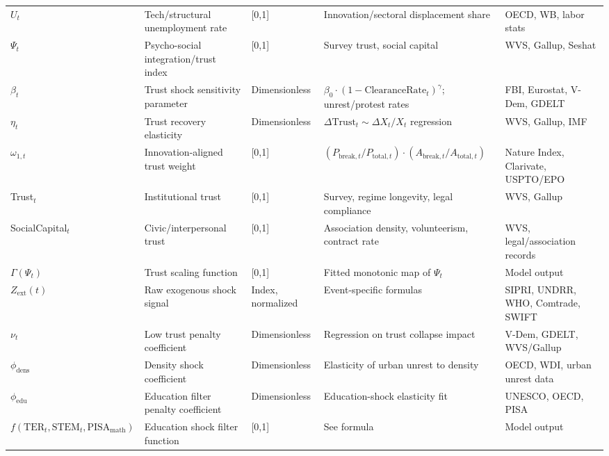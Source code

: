 \documentclass[12pt]{article}
\begin{document}
\begin{longtable}{|p{2.8cm}|p{4.3cm}|p{2.0cm}|p{3.0cm}|p{3.0cm}|}
$U_t$ & Tech/structural unemployment rate & [0,1] & Innovation/sectoral displacement share & OECD, WB, labor stats \\
$\Psi_t$ & Psycho-social integration/trust index & [0,1] & Survey trust, social capital & WVS, Gallup, Seshat \\
$\beta_t$ & Trust shock sensitivity parameter & Dimensionless & $\beta_0 \cdot (1 - \text{ClearanceRate}_t)^\gamma$; unrest/protest rates & FBI, Eurostat, V-Dem, GDELT \\
$\eta_t$ & Trust recovery elasticity & Dimensionless & $\Delta \text{Trust}_t \sim \Delta X_t / X_t$ regression & WVS, Gallup, IMF \\
$\omega_{1,t}$ & Innovation-aligned trust weight & [0,1] & $(P_{\text{break},t} / P_{\text{total},t}) \cdot (A_{\text{break},t} / A_{\text{total},t})$ & Nature Index, Clarivate, USPTO/EPO \\
Trust$_t$ & Institutional trust & [0,1] & Survey, regime longevity, legal compliance & WVS, Gallup \\
SocialCapital$_t$ & Civic/interpersonal trust & [0,1] & Association density, volunteerism, contract rate & WVS, legal/association records \\
$\Gamma(\Psi_t)$ & Trust scaling function & [0,1] & Fitted monotonic map of $\Psi_t$ & Model output \\
$Z_{\text{ext}}(t)$ & Raw exogenous shock signal & Index, normalized & Event-specific formulas & SIPRI, UNDRR, WHO, Comtrade, SWIFT \\
$\nu_t$ & Low trust penalty coefficient & Dimensionless & Regression on trust collapse impact & V-Dem, GDELT, WVS/Gallup \\
$\phi_{\text{dens}}$ & Density shock coefficient & Dimensionless & Elasticity of urban unrest to density & OECD, WDI, urban unrest data \\
$\phi_{\text{edu}}$ & Education filter penalty coefficient & Dimensionless & Education-shock elasticity fit & UNESCO, OECD, PISA \\
$f(\text{TER}_t, \text{STEM}_t, \text{PISA}_\text{math})$ & Education shock filter function & [0,1] & See formula & Model output \\

\end{longtable}
\end{document}
